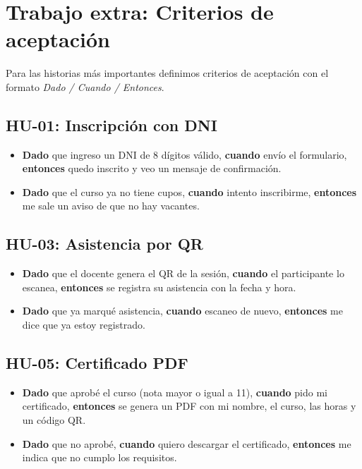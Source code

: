 \section{Trabajo extra: Criterios de aceptación}

Para las historias más importantes definimos criterios de aceptación con el formato \textit{Dado / Cuando / Entonces}.

\subsection{HU-01: Inscripción con DNI}
\begin{itemize}[nosep]
    \item \textbf{Dado} que ingreso un DNI de 8 dígitos válido, \textbf{cuando} envío el formulario, \textbf{entonces} quedo inscrito y veo un mensaje de confirmación.
    \item \textbf{Dado} que el curso ya no tiene cupos, \textbf{cuando} intento inscribirme, \textbf{entonces} me sale un aviso de que no hay vacantes.
\end{itemize}

\subsection{HU-03: Asistencia por QR}
\begin{itemize}[nosep]
    \item \textbf{Dado} que el docente genera el QR de la sesión, \textbf{cuando} el participante lo escanea, \textbf{entonces} se registra su asistencia con la fecha y hora.
    \item \textbf{Dado} que ya marqué asistencia, \textbf{cuando} escaneo de nuevo, \textbf{entonces} me dice que ya estoy registrado.
\end{itemize}

\subsection{HU-05: Certificado PDF}
\begin{itemize}[nosep]
    \item \textbf{Dado} que aprobé el curso (nota mayor o igual a 11), \textbf{cuando} pido mi certificado, \textbf{entonces} se genera un PDF con mi nombre, el curso, las horas y un código QR.
    \item \textbf{Dado} que no aprobé, \textbf{cuando} quiero descargar el certificado, \textbf{entonces} me indica que no cumplo los requisitos.
\end{itemize}

